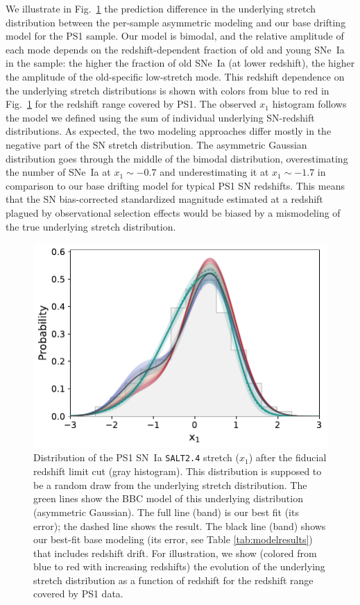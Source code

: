 \documentclass[]{aa}
\begin{document}
We illustrate in Fig.~\ref{fig:bbc_pdf_ps1} the prediction difference in the
underlying stretch distribution between the per-sample asymmetric modeling and
our base drifting model for the PS1 sample. Our model is bimodal, and the
relative amplitude of each mode depends on the redshift-dependent fraction of
old and young SNe~Ia in the sample: the higher the fraction of old SNe~Ia (at
lower redshift), the higher the amplitude of the old-specific low-stretch mode.
This redshift dependence on the underlying stretch distributions is shown with
colors from blue to red in Fig.~\ref{fig:bbc_pdf_ps1} for the redshift range
covered by PS1. The observed $x_1$ histogram follows the model we defined using
the sum of individual underlying SN-redshift distributions. As expected, the two
modeling approaches differ mostly in the negative part of the SN stretch
distribution. The asymmetric Gaussian distribution goes through the middle of
the bimodal distribution, overestimating the number of SNe~Ia at $x_1\sim-0.7$
and underestimating it at $x_1\sim-1.7$ in comparison to our base drifting model
for typical PS1 SN redshifts. This means that the SN bias-corrected standardized
magnitude estimated at a redshift plagued by observational selection effects
would be biased by a mismodeling of the true underlying stretch distribution.

\begin{figure}
    \centering
    \includegraphics[width=\linewidth]{Article_figures/bbc_comp_PS1_hist-nr.pdf}
    \caption{Distribution of the PS1 SN~Ia \textsc{\texttt{SALT2.4}} stretch
        ($x_1$) after the fiducial redshift limit cut (gray histogram). This
        distribution is supposed to be a random draw from the underlying stretch
        distribution. The green lines show the BBC model of this underlying
        distribution (asymmetric Gaussian). The full line (band) is our best fit
        (its error); the dashed line shows the \cite{scolnic2018a} result. The
        black line (band) shows our best-fit base modeling (its error, see
        Table \ref{tab:modelresults}) that includes redshift drift. For
        illustration, we show (colored from blue to red with increasing
        redshifts) the evolution of the underlying stretch distribution as a
        function of redshift for the redshift range covered by PS1 data.}
    \label{fig:bbc_pdf_ps1}
\end{figure}
\end{document}
